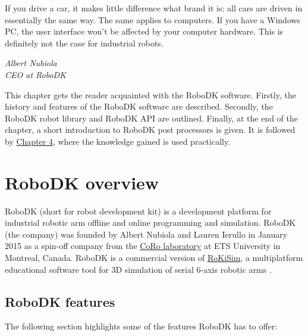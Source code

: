 \label{chap:design}

\epigraph{If you drive a car, it makes little difference what brand it is: all cars are driven
in essentially the same way. The same applies to computers. If you have a
Windows PC, the user interface won’t be affected by your computer hardware.
This is definitely not the case for industrial robots.}{\textit{Albert Nubiola \\ CEO at RoboDK}}

\par This chapter gets the reader acquainted with the RoboDK software. Firstly, the history and features of the RoboDK software are described. Secondly, the RoboDK robot library and RoboDK API are outlined. Finally, at the end of the chapter, a short introduction to RoboDK post processors is given. It is followed by  \hyperref[chap:implementation]{Chapter 4}, where the knowledge gained is used practically. 

\section{RoboDK overview}

RoboDK (short for robot development kit) is a development platform for industrial robotic arm offline and online programming and simulation. 
RoboDK (the company) was founded by Albert Nubiola and Lauren Ierullo in January 2015 as a spin-off company from the \href{https://en.etsmtl.ca/unites-de-recherche/coro/accueil?lang=en-CA}{CoRo laboratory}   at ETS University in Montreal, Canada. RoboDK is a commercial version of \href{https://www.parallemic.org/RoKiSim.html}{RoKiSim}, a multiplatform educational software tool for 3D simulation of serial 6-axis robotic arms \cite{robodkoverview}.

\subsection{RoboDK features}

The following section highlights some of the features RoboDK has to offer: 

